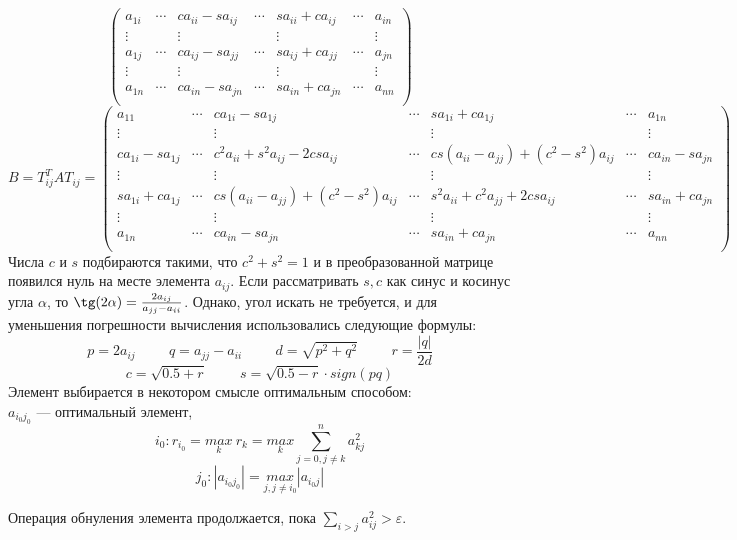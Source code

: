 \documentclass[11pt,a4paper]{article}
\let\epsilon\varepsilon
\renewcommand\;{\hspace{1cm}}
\begin{document}
\[\begin{pmatrix}
    a_{1i} & \cdots & ca_{ii}  - sa_{ij}& \cdots & sa_{ii} + ca_{ij}& \cdots & a_{in}\\
    \vdots & & \vdots & & \vdots & & \vdots \\
    a_{1j} & \cdots & ca_{ij}  - sa_{jj}& \cdots & sa_{ij} + ca_{jj}& \cdots & a_{jn}\\
    \vdots & & \vdots & & \vdots & & \vdots \\
    a_{1n} & \cdots & ca_{in}  - sa_{jn}& \cdots & sa_{in} + ca_{jn}& \cdots & a_{nn}\\
  \end{pmatrix}
\]\[
  B = T_{ij}^{T}AT_{ij} =
  \begin{pmatrix}
    a_{11} & \cdots & ca_{1i} - sa_{1j} & \cdots & sa_{1i}+ ca_{1j}& \cdots & a_{1n}\\
    \vdots & & \vdots & & \vdots & & \vdots \\
    ca_{1i} - sa_{1j} & \cdots & c^{2}a_{ii}  + s^{2}a_{ij} - 2csa_{ij}& \cdots & cs(a_{ii}-a_{jj}) + (c^{2} - s^{2})a_{ij} & \cdots & ca_{in}  - sa_{jn}\\
    \vdots & & \vdots & & \vdots & & \vdots \\
    sa_{1i}+ ca_{1j} & \cdots & cs(a_{ii}-a_{jj}) + (c^{2} - s^{2})a_{ij}& \cdots & s^{2}a_{ii} + c^{2}a_{jj} + 2csa_{ij}& \cdots & sa_{in} + ca_{jn}\\
    \vdots & & \vdots & & \vdots & & \vdots \\
    a_{1n} & \cdots & ca_{in}  - sa_{jn}& \cdots & sa_{in} + ca_{jn}& \cdots & a_{nn}\\
  \end{pmatrix}
\]
Числа $c$ и $s$ подбираются такими, что $c^{2} + s^{2} = 1$ и в преобразованной матрице появился нуль на месте элемента $a_{ij}$. Если рассматривать $s,c$ как синус и косинус угла $\alpha$, то $\tg(2\alpha) = \frac{2a_{ij}}{a_{jj}-a_{ii}}$.
Однако, угол искать не требуется, и для уменьшения погрешности вычисления использовались следующие формулы:\[
  p = 2a_{ij} \; q = a_{jj}-a_{ii} \; d = \sqrt{p^{2}+q^{2}} \; r = \frac{|q|}{2d}
\]\[
  c = \sqrt{0.5+r} \; s = \sqrt{0.5-r}\cdot sign(pq)
\]
Элемент выбирается в некотором смысле оптимальным способом:\\
$a_{i_{0}j_{0}}$ --- оптимальный элемент, \[
  i_{0}: r_{i_{0}} = \underset{k}{max}\: r_{k} = \underset{k}{max} \sum_{j=0,j\neq k}^{n} a_{kj}^{2}
\]\[
  j_{0}: |a_{i_{0}j_{0}}| = \underset{j,j\neq i_{0}}{max} |a_{i_{0}j}|
\]

Операция обнуления элемента продолжается, пока $\sum_{i>j}a^{2}_{ij} > \epsilon$.
\end{document}
